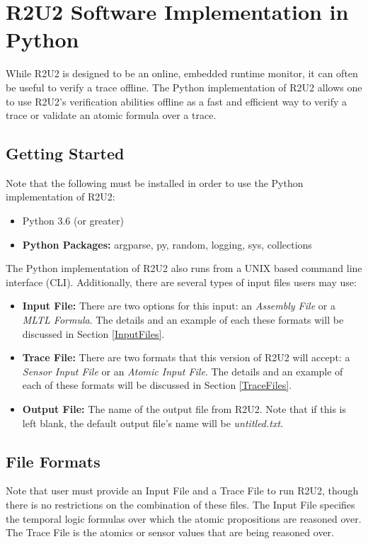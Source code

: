 \section{R2U2 Software Implementation in Python}
While R2U2 is designed to be an online, embedded runtime monitor, it can often be useful to verify a trace offline. The Python implementation of R2U2 allows one to use R2U2's verification abilities offline as a fast and efficient way to verify a trace or validate an atomic formula over a trace.

\subsection{Getting Started}
Note that the following must be installed in order to use the Python implementation of R2U2:
\begin{itemize}
	\item Python 3.6 (or greater)
	\item \textbf{Python Packages:} argparse, py, random, logging, sys, collections
\end{itemize}
The Python implementation of R2U2 also runs from a UNIX based command line interface (CLI). Additionally, there are several types of input files users may use: 
\begin{itemize}
	\item \textbf{Input File:} There are two options for this input: an \textit{Assembly File} or a \textit{MLTL Formula}. The details and an example of each these formats will be discussed in Section \ref{InputFiles}.
	\item \textbf{Trace File:} There are two formats that this version of R2U2 will accept: a \textit{Sensor Input File} or an \textit{Atomic Input File}. The details and an example of each of these formats will be discussed in Section \ref{TraceFiles}.
	\item \textbf{Output File:} The name of the output file from R2U2. Note that if this is left blank, the default output file's name will be \textit{untitled.txt}.
\end{itemize}

\subsection{File Formats}
Note that user must provide an Input File and a Trace File to run R2U2, though there is no restrictions on the combination of these files. The Input File specifies the temporal logic formulas over which the atomic propositions are reasoned over. The Trace File is the atomics or sensor values that are being reasoned over.

